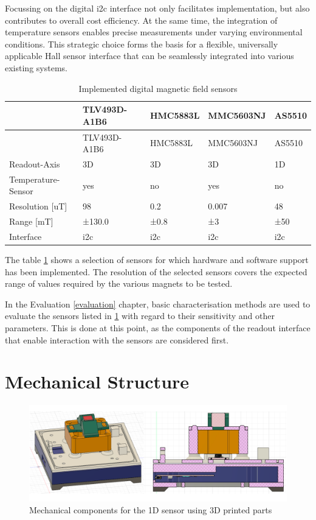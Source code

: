 Focussing on the digital \gls{i2c} interface not only facilitates
implementation, but also contributes to overall cost efficiency. At the
same time, the integration of temperature sensors enables precise
measurements under varying environmental conditions. This strategic
choice forms the basis for a flexible, universally applicable Hall
sensor interface that can be seamlessly integrated into various existing
systems.

\begin{longtable}[]{@{}lllll@{}}
\caption{Implemented digital magnetic field sensors
\label{Implemented_digital_magnetic_field_sensors.csv}}\tabularnewline
\toprule
& TLV493D-A1B6 & HMC5883L & MMC5603NJ & AS5510\tabularnewline
\midrule
\endfirsthead
\toprule
& TLV493D-A1B6 & HMC5883L & MMC5603NJ & AS5510\tabularnewline
\midrule
\endhead
Readout-Axis & 3D & 3D & 3D & 1D\tabularnewline
Temperature-Sensor & yes & no & yes & no\tabularnewline
Resolution {[}uT{]} & 98 & 0.2 & 0.007 & 48\tabularnewline
Range {[}mT{]} & ±130.0 & ±0.8 & ±3 & ±50\tabularnewline
Interface & \gls{i2c} & \gls{i2c} & \gls{i2c} & \gls{i2c}\tabularnewline
\bottomrule
\end{longtable}

The table \ref{Implemented_digital_magnetic_field_sensors.csv} shows a
selection of sensors for which hardware and software support has been
implemented. The resolution of the selected sensors covers the expected
range of values required by the various magnets to be tested.

In the Evaluation \ref{evaluation} chapter, basic characterisation
methods are used to evaluate the sensors listed in
\ref{Implemented_digital_magnetic_field_sensors.csv} with regard to
their sensitivity and other parameters. This is done at this point, as
the components of the readout interface that enable interaction with the
sensors are considered first.

\hypertarget{mechanical-structure}{%
\section{Mechanical Structure}\label{mechanical-structure}}

\begin{figure}
\centering
\includegraphics{./generated_images/border_Mechanical_components_for_the_1D_sensor_using_3D_printed_parts.png}
\caption{Mechanical components for the 1D sensor using 3D printed parts
\label{Mechanical_components_for_the_1D_sensor_using_3D_printed_parts.png}}
\end{figure}

